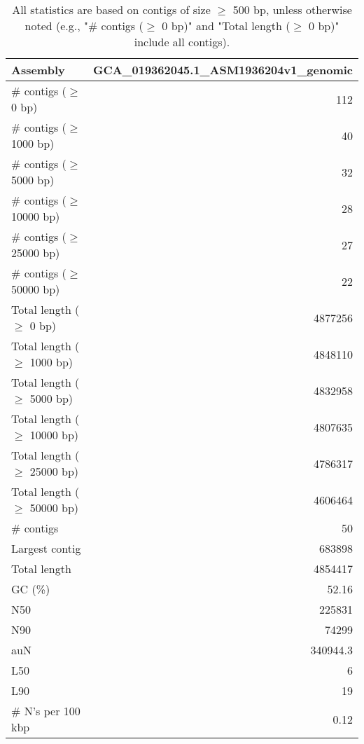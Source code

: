 \documentclass[12pt,a4paper]{article}
\begin{document}
\begin{table}[ht]
\begin{center}
\caption{All statistics are based on contigs of size $\geq$ 500 bp, unless otherwise noted (e.g., "\# contigs ($\geq$ 0 bp)" and "Total length ($\geq$ 0 bp)" include all contigs).}
\begin{tabular}{|l*{1}{|r}|}
\hline
Assembly & GCA\_019362045.1\_ASM1936204v1\_genomic \\ \hline
\# contigs ($\geq$ 0 bp) & 112 \\ \hline
\# contigs ($\geq$ 1000 bp) & 40 \\ \hline
\# contigs ($\geq$ 5000 bp) & 32 \\ \hline
\# contigs ($\geq$ 10000 bp) & 28 \\ \hline
\# contigs ($\geq$ 25000 bp) & 27 \\ \hline
\# contigs ($\geq$ 50000 bp) & 22 \\ \hline
Total length ($\geq$ 0 bp) & 4877256 \\ \hline
Total length ($\geq$ 1000 bp) & 4848110 \\ \hline
Total length ($\geq$ 5000 bp) & 4832958 \\ \hline
Total length ($\geq$ 10000 bp) & 4807635 \\ \hline
Total length ($\geq$ 25000 bp) & 4786317 \\ \hline
Total length ($\geq$ 50000 bp) & 4606464 \\ \hline
\# contigs & 50 \\ \hline
Largest contig & 683898 \\ \hline
Total length & 4854417 \\ \hline
GC (\%) & 52.16 \\ \hline
N50 & 225831 \\ \hline
N90 & 74299 \\ \hline
auN & 340944.3 \\ \hline
L50 & 6 \\ \hline
L90 & 19 \\ \hline
\# N's per 100 kbp & 0.12 \\ \hline
\end{tabular}
\end{center}
\end{table}
\end{document}
